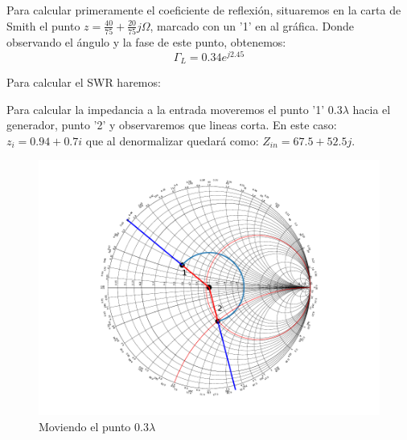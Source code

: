 Para calcular primeramente el coeficiente de reflexión, situaremos en la carta de Smith el punto $z = \frac{40}{75} + \frac{20}{75}j \Omega$, marcado con un '1' en al gráfica. Donde observando el ángulo y la fase de este punto, obtenemos:
\[ \Gamma_L = 0.34e^{j2.45} \]

Para calcular el SWR haremos:

Para calcular la impedancia a la entrada moveremos el punto '1' $0.3 \lambda$ hacia el generador, punto '2' y observaremos que lineas corta. En este caso:
$z_i = 0.94 + 0.7i$ que al denormalizar quedará como: $Z_{in} = 67.5 + 52.5j$.

\begin{figure}[h]
  \centering
  \includegraphics[scale = 0.85]{ej2/images/out.pdf}
  \caption{Moviendo el punto $0.3 \lambda$}
  \label{ej2smith}
\end{figure}
